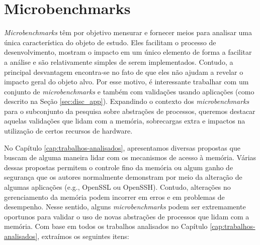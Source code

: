 

\section{Microbenchmarks}
\label{sec:micro}

\emph{Microbenchmarks} têm por objetivo mensurar e fornecer meios para
analisar uma única característica do objeto de estudo. Eles
facilitam o processo de desenvolvimento,
mostram o impacto em um único elemento de forma a facilitar a análise e são
relativamente simples de serem implementados. Contudo, a principal desvantagem
encontra-se no fato de que eles não ajudam a revelar o impacto geral do objeto
alvo. Por esse motivo, é interessante trabalhar com um conjunto de
\emph{microbenchmarks} e também com validações usando aplicações (como
descrito na Seção \ref{sec:disc_app}). Expandindo o contexto dos
\emph{microbenchmarks} para o subconjunto da pesquisa sobre abstrações de
processos, queremos destacar aquelas validações que lidam com a memória,
sobrecargas extra e impactos na utilização de certos recursos de hardware.

No Capítulo \ref{cap:trabalhos-analisados}, apresentamos diversas propostas que
buscam de alguma maneira lidar com os mecanismos de acesso à memória. Várias
dessas propostas permitem o controle fino da memória ou algum ganho de
segurança que os autores normalmente demonstram por meio da alteração de
algumas aplicações (e.g., OpenSSL ou OpenSSH). Contudo, alterações no
gerenciamento da memória podem incorrer em erros e em problemas de desempenho.
Nesse sentido, alguns \emph{microbenchmarks} podem ser extremamente oportunos
para validar o uso de novas abstrações de processos que lidam com a memória.
Com base em todos os trabalhos analisados no Capítulo
\ref{cap:trabalhos-analisados}, extraímos os seguintes itens:

